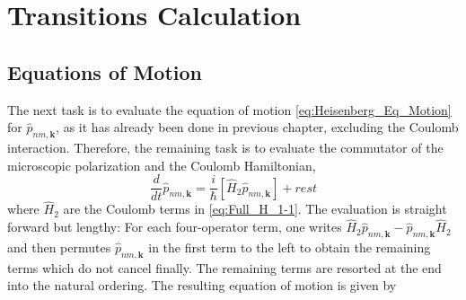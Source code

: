 \section{Transitions Calculation}


\subsection{Equations of Motion}

The next task is to evaluate the equation of motion \ref{eq:Heisenberg_Eq_Motion}
for $\hat{p}_{nm,\mathbf{k}}$, as it has already been done in previous
chapter, excluding the Coulomb interaction. Therefore, the remaining
task is to evaluate the commutator of the microscopic polarization
and the Coulomb Hamiltonian,\begin{equation}
\frac{d}{dt}\hat{p}_{nm,\mathbf{k}}=\frac{i}{\hbar}\left[\hat{H}_{2}\hat{p}_{nm,\mathbf{k}}\right]+rest\end{equation}
where $\hat{H}_{2}$ are the Coulomb terms in \ref{eq:Full_H_1-1}.
The evaluation is straight forward but lengthy: For each four-operator
term, one writes $\hat{H}_{2}\hat{p}_{nm,\mathbf{k}}-\hat{p}_{nm,\mathbf{k}}\hat{H}_{2}$
and then permutes $\hat{p}_{nm,\mathbf{k}}$ in the first term to
the left to obtain the remaining terms which do not cancel finally.
The remaining terms are resorted at the end into the natural ordering.
The resulting equation of motion is given by

